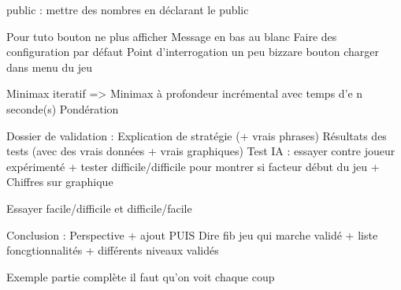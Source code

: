 public : mettre des nombres en déclarant le public

Pour tuto bouton ne plus afficher
Message en bas au blanc
Faire des configuration par défaut
Point d'interrogation un peu bizzare
bouton charger dans menu du jeu

Minimax iteratif => Minimax à profondeur incrémental avec temps d'e n seconde(s)
Pondération

Dossier de validation : 
Explication de stratégie (+ vrais phrases)
Résultats des tests (avec des vrais données + vrais graphiques)
Test IA : essayer contre joueur expérimenté  + tester difficile/difficile pour montrer si facteur début du jeu
+ Chiffres sur graphique

Essayer facile/difficile et difficile/facile

Conclusion :
Perspective + ajout PUIS
Dire fib jeu qui marche validé + liste foncgtionnalités + différents niveaux validés


Exemple partie complète il faut qu'on voit chaque coup
